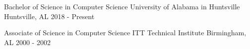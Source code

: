 
\begin{cventries}
  \cventry
    {Bachelor of Science in Computer Science} %
    {University of Alabama in Huntsville} %
    {Huntsville, AL} %
    {2018 - Present} %
    {}

  \cventry
    {Associate of Science in Computer Science} %
    {ITT Technical Institute} %
    {Birmingham, AL} %
    {2000 - 2002} %
    {}

\end{cventries}

